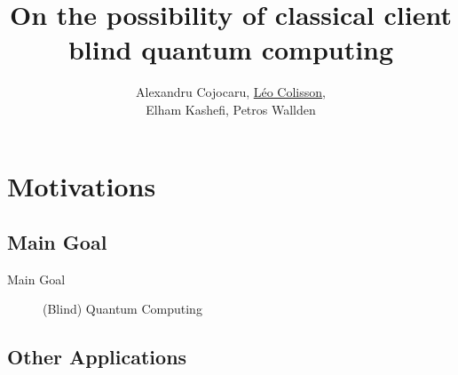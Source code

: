 \documentclass[]{beamer}
\title[QFactory and classical blind quantum computing]{On the possibility of classical client blind quantum computing}
\author[A. Cojocaru, L. Colisson, E. Kashefi, P. Wallden]{Alexandru Cojocaru, \underline{Léo Colisson},\\ Elham Kashefi, Petros Wallden}
\begin{document}

\begin{frame}
  \titlepage
\end{frame}

\begin{frame}
  \tableofcontents
\end{frame}


\section{Motivations}

\subsection{Main Goal}

\begin{frame}{Main Goal}
  \begin{figure}[ht]
    \centering
    \caption{(Blind) Quantum Computing}
  \end{figure}
\end{frame}

\subsection{Other Applications}
\end{document}
